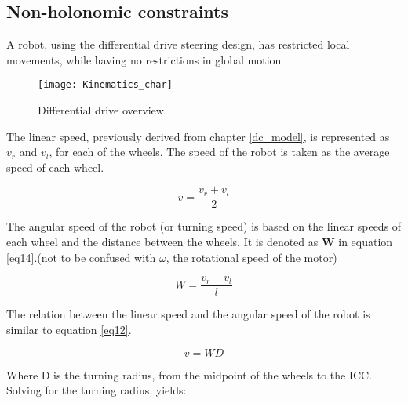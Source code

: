 \subsection{Non-holonomic constraints} 

A robot, using the differential drive steering design, has restricted local movements, while having no restrictions in global motion

\begin{figure}[h]
\centering
\texttt{[image: Kinematics\_char]}
\caption{Differential drive overview\cite{DDO}}
\label{fig::diff_drive_over}
\end{figure}

The linear speed, previously derived from chapter \ref{dc_model}, is represented as $v_r$ and $v_l$, for each of the wheels. The speed of the robot is taken as the average speed of each wheel.

\begin{equation} \label{eq13}
v = \frac{v_r + v_l}{2} 
\end{equation}

The angular speed of the robot (or turning speed) is based on the linear speeds of each wheel and the distance between the wheels. It is denoted as \textbf{W} in equation \ref{eq14}.(not to be confused with $\omega$, the rotational speed of the motor)

\begin{equation} \label{eq14}
W = \frac{v_r - v_l}{l}
\end{equation}

The relation between the linear speed and the angular speed of the robot is similar to equation \ref{eq12}.

\begin{equation} \label{eq15} 
v = WD
\end{equation}

Where D is the turning radius, from the midpoint of the wheels to the ICC. Solving for the turning radius, yields:

